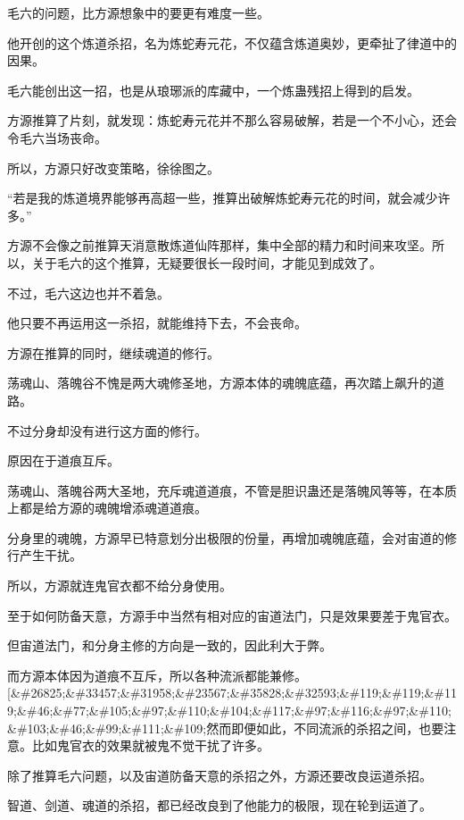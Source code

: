 
\begin{this_body}

毛六的问题，比方源想象中的要更有难度一些。

他开创的这个炼道杀招，名为炼蛇寿元花，不仅蕴含炼道奥妙，更牵扯了律道中的因果。

毛六能创出这一招，也是从琅琊派的库藏中，一个炼蛊残招上得到的启发。

方源推算了片刻，就发现：炼蛇寿元花并不那么容易破解，若是一个不小心，还会令毛六当场丧命。

所以，方源只好改变策略，徐徐图之。

“若是我的炼道境界能够再高超一些，推算出破解炼蛇寿元花的时间，就会减少许多。”

方源不会像之前推算天消意散炼道仙阵那样，集中全部的精力和时间来攻坚。所以，关于毛六的这个推算，无疑要很长一段时间，才能见到成效了。

不过，毛六这边也并不着急。

他只要不再运用这一杀招，就能维持下去，不会丧命。

方源在推算的同时，继续魂道的修行。

荡魂山、落魄谷不愧是两大魂修圣地，方源本体的魂魄底蕴，再次踏上飙升的道路。

不过分身却没有进行这方面的修行。

原因在于道痕互斥。

荡魂山、落魄谷两大圣地，充斥魂道道痕，不管是胆识蛊还是落魄风等等，在本质上都是给方源的魂魄增添魂道道痕。

分身里的魂魄，方源早已特意划分出极限的份量，再增加魂魄底蕴，会对宙道的修行产生干扰。

所以，方源就连鬼官衣都不给分身使用。

至于如何防备天意，方源手中当然有相对应的宙道法门，只是效果要差于鬼官衣。

但宙道法门，和分身主修的方向是一致的，因此利大于弊。

而方源本体因为道痕不互斥，所以各种流派都能兼修。[\&\#26825;\&\#33457;\&\#31958;\&\#23567;\&\#35828;\&\#32593;\&\#119;\&\#119;\&\#119;\&\#46;\&\#77;\&\#105;\&\#97;\&\#110;\&\#104;\&\#117;\&\#97;\&\#116;\&\#97;\&\#110;\&\#103;\&\#46;\&\#99;\&\#111;\&\#109;然而即便如此，不同流派的杀招之间，也要注意。比如鬼官衣的效果就被鬼不觉干扰了许多。

除了推算毛六问题，以及宙道防备天意的杀招之外，方源还要改良运道杀招。

智道、剑道、魂道的杀招，都已经改良到了他能力的极限，现在轮到运道了。


\end{this_body}

